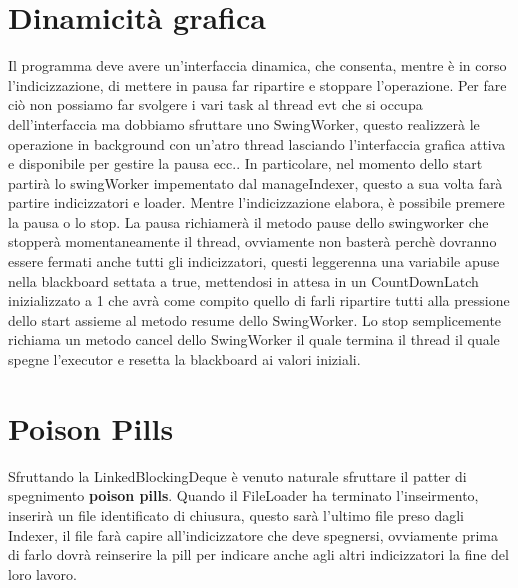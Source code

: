 \documentclass{article}
\begin{document}
\section{Dinamicità grafica}
Il programma deve avere un'interfaccia dinamica, che consenta, mentre è in corso l'indicizzazione, di mettere in pausa far ripartire e stoppare l'operazione. Per fare ciò non possiamo far svolgere i vari task al thread evt che si occupa dell'interfaccia ma dobbiamo sfruttare uno SwingWorker, questo realizzerà le operazione in background con un'atro thread lasciando l'interfaccia grafica attiva e disponibile per gestire la pausa ecc..
In particolare, nel momento dello start partirà lo swingWorker impementato dal manageIndexer, questo a sua volta farà partire indicizzatori e loader.
Mentre l'indicizzazione elabora, è possibile premere la pausa o lo stop. La pausa richiamerà il metodo pause dello swingworker che stopperà momentaneamente il thread, ovviamente non basterà perchè dovranno essere fermati anche tutti gli indicizzatori, questi leggerenna una variabile apuse nella blackboard settata a true,  mettendosi in attesa in un CountDownLatch inizializzato a 1 che avrà come compito quello di farli ripartire tutti alla pressione dello start assieme al metodo resume dello SwingWorker.
Lo stop semplicemente richiama un metodo cancel dello SwingWorker il quale termina il thread il quale spegne l'executor e resetta la blackboard ai valori iniziali.

\section{Poison Pills}
Sfruttando la LinkedBlockingDeque è venuto naturale sfruttare il patter di spegnimento \textbf{poison pills}. Quando il FileLoader ha terminato l'inseirmento, inserirà un file identificato di chiusura, questo sarà l'ultimo file preso dagli Indexer, il file farà capire all'indicizzatore che deve spegnersi, ovviamente prima di farlo dovrà reinserire la pill per indicare anche agli altri indicizzatori la fine del loro lavoro.
\end{document}

